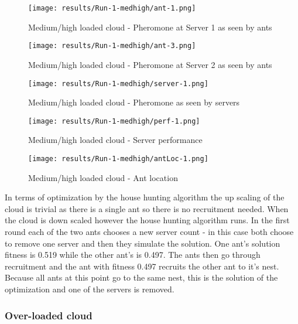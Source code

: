 \begin{figure}[!ht]
	\centering
		\texttt{[image: results/Run-1-medhigh/ant-1.png]}
	\caption{Medium/high loaded cloud - Pheromone at Server 1 as seen by ants}
	\label{fig:1serv-ant1-medhigh}
\end{figure}

\begin{figure}
	\centering
		\texttt{[image: results/Run-1-medhigh/ant-3.png]}
	\caption{Medium/high loaded cloud - Pheromone at Server 2 as seen by ants}
	\label{fig:1serv-ant3-medhigh}
\end{figure}

\begin{figure}
	\centering
		\texttt{[image: results/Run-1-medhigh/server-1.png]}
	\caption{Medium/high loaded cloud - Pheromone as seen by servers}
	\label{fig:1serv-pher-medhigh}
\end{figure}

\begin{figure}
	\centering
		\texttt{[image: results/Run-1-medhigh/perf-1.png]}
	\caption{Medium/high loaded cloud - Server performance}
	\label{fig:1serv-perf-medhigh}
\end{figure}

\begin{figure}
	\centering
		\texttt{[image: results/Run-1-medhigh/antLoc-1.png]}
	\caption{Medium/high loaded cloud - Ant location}
	\label{fig:1serv-antloc-medhigh}
\end{figure}

In terms of optimization by the house hunting algorithm the up scaling of the cloud is trivial as there is a single ant so there is no recruitment needed. When the cloud is down scaled however the house hunting algorithm runs. In the first round each of the two ants chooses a new server count - in this case both choose to remove one server and then they simulate the solution. One ant's solution fitness is 0.519 while the other ant's is 0.497. The ants then go through recruitment and the ant with fitness 0.497 recruits the other ant to it's nest. Because all ants at this point go to the same nest, this is the solution of the optimization and one of the servers is removed.

\subsubsection{Over-loaded cloud}

